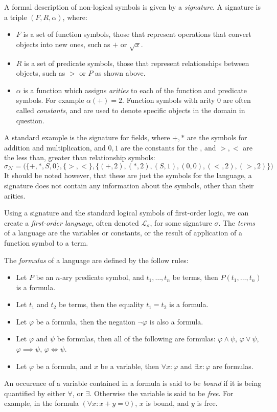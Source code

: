 \documentclass[12pt]{article}
\theoremstyle{definition}
\begin{document}
A formal description of non-logical symbols is
given by a \emph{signature}. A signature is a triple $(F,R,\alpha)$, where:
\begin{itemize}
\item $F$ is a set of function symbols, those that represent operations that convert objects into new ones, such as $+$ or $\sqrt{x}$.
\item $R$ is a set of predicate symbols, those that represent relationships between objects, such as $>$ or $P$ as shown above.
\item $\alpha$ is a function which assigns \emph{arities} to each of the function and predicate symbols.
For example $\alpha(+) = 2$. Function symbols with arity $0$ are often called \emph{constants}, and are used to denote specific objects in the domain in question.
\end{itemize}
A standard example is the signature for fields, where $+,*$ are the symbols for addition and multiplication, and $0,1$ are the constants for the , and $>,<$ are the less than, greater than relationship symbols:
$$\sigma_{\mathcal{N}} = \big(\{+, *, S, 0\},\{>,<\},\{(+, 2), (*, 2), (S,1), (0,0), (<,2),(>,2)\}\big)$$
It should be noted however, that these are just the symbols for the language, a signature does not contain any information about the symbols, other than their arities.

Using a signature and the standard logical symbols of first-order logic, we can create a \emph{first-order language}, often denoted $\mathcal{L}_\sigma$, for some signature $\sigma$.
The \emph{terms} of a language are the variables or constants, or the result of application of a function symbol to a term.

The \emph{formulas} of a language are defined by the follow rules:
\begin{itemize}
  \item Let $P$ be an $n$-ary predicate symbol, and $t_1,\ldots,t_n$ be terms, then $P(t_1,\ldots,t_n)$ is a formula.
  \item Let $t_1$ and $t_2$ be terms, then the equality $t_1 = t_2$ is a formula.
  \item Let $\varphi$ be a formula, then the negation $\neg\varphi$ is also a formula.
  \item Let $\varphi$ and $\psi$ be formulas, then all of the following are formulas: $\varphi\wedge\psi$, $\varphi\vee\psi$, $\varphi\implies\psi$, $\varphi\iff\psi$.
  \item Let $\varphi$ be a formula, and $x$ be a variable, then $\forall x:\varphi$ and $\exists x:\varphi$ are formulas.
\end{itemize}
An occurence of a variable contained in a formula is said to be \emph{bound} if it is being quantified by either $\forall$, or $\exists$.
Otherwise the variable is said to be \emph{free}. For example, in the formula $(\forall x: x+y=0)$, $x$ is bound, and $y$ is free.
\end{document}

